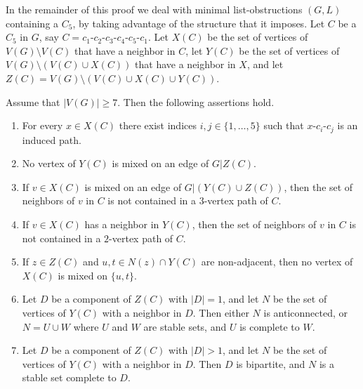\documentclass[11pt]{article}
\begin{document}
In the remainder of this proof we deal with minimal list-obstructions 
$(G,L)$ containing a $C_5$, by taking advantage of the structure that it 
imposes. Let $C$ be a $C_5$ in $G$,  
say $C=c_1$-$c_2$-$c_3$-$c_4$-$c_5$-$c_1$. 
Let $X(C)$ be the set of vertices of $V(G) \setminus V(C)$ that have a neighbor in $C$,
let $Y(C)$ be the set of vertices of $V(G) \setminus (V(C) \cup X(C))$ that have a neighbor in $X$, 
and let $Z(C)=V(G) \setminus (V(C) \cup X(C) \cup Y(C))$.

\begin{claim}\label{notmixed}
Assume that $|V(G)| \ge 7$. 
Then the following assertions hold.
\begin{enumerate}
\item For every
$x \in X(C)$ there exist indices $i,j \in \{1,\ldots,5\}$ such that $x$-$c_i$-$c_j$ is an induced path. 
\item No vertex of $Y(C)$ is mixed on an edge of $G|Z(C)$.
\item If $v \in X(C)$ is mixed on an edge of $G|(Y(C) \cup Z(C))$, then the set of neighbors of $v$ in $C$ is not contained in a $3$-vertex path of $C$.
\item If $v \in X(C)$ has a neighbor in $Y(C)$, then the set of neighbors of $v$ in $C$ is not contained in a $2$-vertex path of $C$.
\item If $z \in Z(C)$ and $u,t \in N(z) \cap Y(C)$ are non-adjacent, then no vertex
of $X(C)$ is mixed on $\{u,t\}$.
\item Let $D$ be a component of $Z(C)$ with $|D|=1$, and let $N$ be the set of vertices of $Y(C)$ with a neighbor in $D$. Then either $N$ is anticonnected,
or $N=U \cup W$ where $U$ and $W$ are stable sets, and  $U$ is complete to $W$.
\item Let $D$  be a component of $Z(C)$ with $|D|>1$, and let $N$ be the set of vertices of $Y(C)$ with a neighbor in $D$.   Then $D$ is bipartite, and
$N$ is a stable set complete to $D$.
\end{enumerate}
\end{claim}
\end{document}

